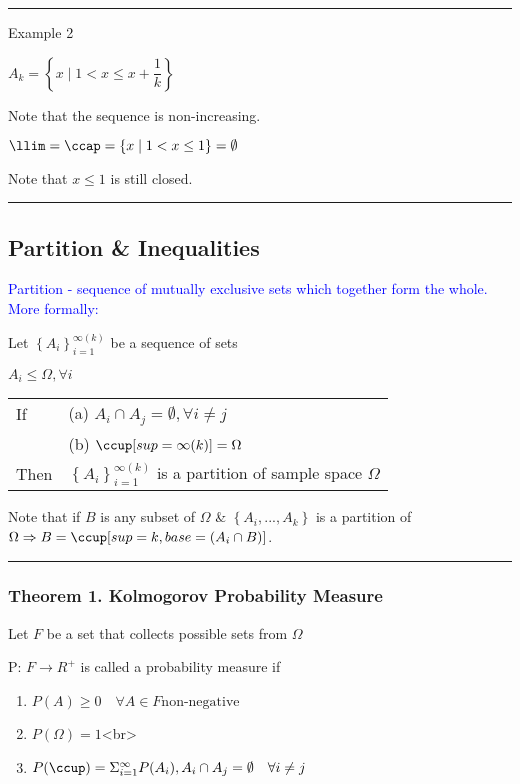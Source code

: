 \documentclass[12pt]{article}
\newcommand{\ddef}[1]{\textcolor{blue}{#1}}
\newcommand{\braces}[1]{\left\{#1\right\}}
\newcommand{\divider}[0]{\rule{\textwidth}{0.1pt}}
\begin{document}
\divider

Example 2

\(A_k = \braces{x \mid 1 < x \le x + \dfrac{1}{k}}\)

Note that the sequence is non-increasing.

\(\llim = \ccap = \braces{x \mid 1 < x \le 1} = \emptyset\)

Note that \(x \le 1\) is still closed.

\divider

\subsection{Partition \& Inequalities}

\ddef{Partition - sequence of mutually exclusive sets which together form the whole. More formally:}

Let \(\braces{A_i}_{i = 1}^{\infty (k)}\) be a sequence of sets

\(A_i \le \Omega, \forall i\)

\begin{tabular}{@{} l l}
If		& (a) \(A_i \cap A_j = \emptyset, \forall i \ne j\) \\
		& (b) \(\ccup[sup=\infty (k)] = \Omega \) \\
Then 	& $\braces{A_i}_{i=1}^{\infty(k)}$ is a partition of sample space $\Omega$
\end{tabular}

Note that if $B$ is any subset of $\Omega$ \& $\braces{A_i, ..., A_k}$ is a partition of $\Omega \Rightarrow B = \ccup[sup=k, base=(A_i \cap B)]$.

\divider

\subsubsection{Theorem 1. Kolmogorov Probability Measure}

Let \(F\) be a set that collects possible sets from \(\Omega\)

P: \(F \rightarrow R^+\) is called a probability measure if

\begin{enumerate}[label=(\alph*)]
	\item \(P(A) \ge 0 \quad \forall A \in F \text{non-negative}\)
	\item \(P(\Omega) = 1\)<br>
	\item \(P(\ccup) = \Sigma_{i=1}^{\infty} P(A_i), A_i \cap A_j = \emptyset \quad \forall i \ne j\)
\end{enumerate}
\end{document}
